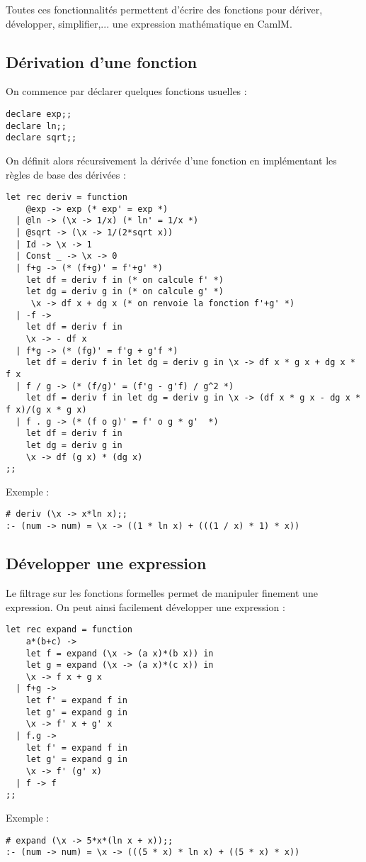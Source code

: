 \documentclass[a4paper, 12pt]{article}
\begin{document}
Toutes ces fonctionnalités permettent d'écrire des fonctions pour dériver, développer, simplifier,... une expression mathématique en CamlM.

\subsection{Dérivation d'une fonction}
On commence par déclarer quelques fonctions usuelles : 
\begin{lstlisting}
declare exp;;
declare ln;;
declare sqrt;;
\end{lstlisting}
On définit alors récursivement la dérivée d'une fonction en implémentant les règles de base des dérivées : 
\begin{lstlisting}
let rec deriv = function
    @exp -> exp (* exp' = exp *)
  | @ln -> (\x -> 1/x) (* ln' = 1/x *)
  | @sqrt -> (\x -> 1/(2*sqrt x))
  | Id -> \x -> 1
  | Const _ -> \x -> 0
  | f+g -> (* (f+g)' = f'+g' *)
    let df = deriv f in (* on calcule f' *)
    let dg = deriv g in (* on calcule g' *)
     \x -> df x + dg x (* on renvoie la fonction f'+g' *)
  | -f ->
    let df = deriv f in
    \x -> - df x
  | f*g -> (* (fg)' = f'g + g'f *)
    let df = deriv f in let dg = deriv g in \x -> df x * g x + dg x * f x
  | f / g -> (* (f/g)' = (f'g - g'f) / g^2 *)
    let df = deriv f in let dg = deriv g in \x -> (df x * g x - dg x * f x)/(g x * g x)
  | f . g -> (* (f o g)' = f' o g * g'  *)
    let df = deriv f in
    let dg = deriv g in
    \x -> df (g x) * (dg x)
;;
\end{lstlisting}
Exemple : 
\begin{lstlisting}
# deriv (\x -> x*ln x);;
:- (num -> num) = \x -> ((1 * ln x) + (((1 / x) * 1) * x))
\end{lstlisting}
\subsection{Développer une expression}

Le filtrage sur les fonctions formelles permet de manipuler finement une expression.
On peut ainsi facilement développer une expression : 
\begin{lstlisting}
let rec expand = function
    a*(b+c) ->
    let f = expand (\x -> (a x)*(b x)) in
    let g = expand (\x -> (a x)*(c x)) in
    \x -> f x + g x
  | f+g -> 
    let f' = expand f in 
    let g' = expand g in
    \x -> f' x + g' x
  | f.g -> 
    let f' = expand f in 
    let g' = expand g in
    \x -> f' (g' x)
  | f -> f
;;
\end{lstlisting}
Exemple : 
\begin{lstlisting}
# expand (\x -> 5*x*(ln x + x));;
:- (num -> num) = \x -> (((5 * x) * ln x) + ((5 * x) * x))
\end{lstlisting}
\end{document}
